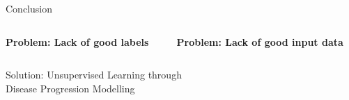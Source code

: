 \documentclass[8pt,xcolor=table,aspectratio=169]{beamer}
\begin{document}
\begin{frame}{Conclusion}




\begin{columns}[t]
\begin{column}{0.5\textwidth}
\centering

\textbf{\large Problem: Lack of good labels}


\vspace{1em}


\end{column}
\begin{column}{0.5\textwidth}
\centering

\textbf{\large Problem: Lack of good input data}


\vspace{1em}


\end{column}
\end{columns}


\begin{columns}[t]
\begin{column}{0.5\textwidth}
\centering

 Solution: Unsupervised Learning through\\
 Disease Progression Modelling\\
\vo

 


\end{column}
\end{columns}
\end{frame}
\end{document}
